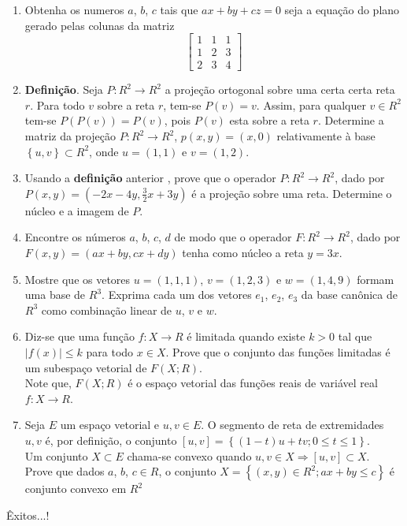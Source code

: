\documentclass[12pt,openright,oneside,a4paper,english,french,spanish,brazil]{abntex2}
\begin{document}
\begin{enumerate}[]
\item Obtenha os numeros $a$, $b$, $c$ tais que $ax+by+cz=0$ seja a equação do plano gerado pelas colunas da matriz
\begin{equation*}
\left[\begin{array}{rrr}
1&1&1\\
1&2&3\\
2&3&4
\end{array}\right]
\end{equation*}

\item \textbf{Definição}. Seja $P:R^{2}\longrightarrow R^{2}$ a projeção ortogonal sobre uma certa certa reta $r$. Para todo $v$ sobre a reta $r$, tem-se $P(v)=v$. Assim, para qualquer $v\in R^{2}$ tem-se $P(P(v))=P(v)$, pois $P(v) $ esta sobre a reta $r$. Determine a matriz da projeção $P:R^{2}\longrightarrow R^{2}$, $p(x,y)=(x,0)$ relativamente à base $\left\lbrace u,v\right\rbrace \subset R^{2} $, onde $u=(1,1)$ e $v=(1,2)$.
\item Usando a \textbf{definição} anterior , prove que o operador $P:R^{2}\longrightarrow R^{2}$, dado por $P(x,y)=(-2x-4y,\frac{3}{2}x +3y)$ é a projeção sobre uma reta. Determine o núcleo e a imagem de $P$.
\item Encontre os números $a$, $b$, $c$, $d$ de modo que o operador $F: R^{2} \longrightarrow R^{2}$, dado por $F(x,y)=(ax+by,cx+dy)$ tenha como núcleo a reta $y=3x$.
\item Mostre que os vetores $u=(1,1,1)$, $v=(1,2,3)$ e $w=(1,4,9)$ formam uma base de $R^{3}$. Exprima cada um dos vetores $e_{1}$, $e_{2}$, $e_{3}$ da base canônica de $R^{3}$ como combinação linear de $u$, $v$ e $w$. 
\item Diz-se que uma função $f:X\longrightarrow R$ é limitada quando existe $k>0$ tal que $\left| f(x) \right|\leq k$ para todo $x\in X$. Prove que o conjunto das funções limitadas é um subespaço vetorial de $F(X;R)$.\\ 
Note que, $F(X;R)$ é o espaço vetorial das funções reais de variável real $f:X\longrightarrow R$.
\item Seja $E$ um espaço vetorial e $u, v \in E$. O segmento de reta de extremidades $u,v$ é, por definição, o conjunto 
$[u,v]=\left\lbrace (1-t)u+tv; 0\leq t\leq1\right\rbrace $.\\
Um conjunto $X\subset E$ chama-se convexo quando $u,v \in X \Rightarrow [u,v]\subset X$.\\
Prove que dados $a$, $b$, $c\in R$, o conjunto $X=\left\lbrace(x,y)\in R^{2}; ax+by\leq c\right\rbrace$ é conjunto convexo em $R^{2}$   
\end{enumerate}
\begin{flushright}
	Êxitos...!
\end{flushright}
\end{document}
